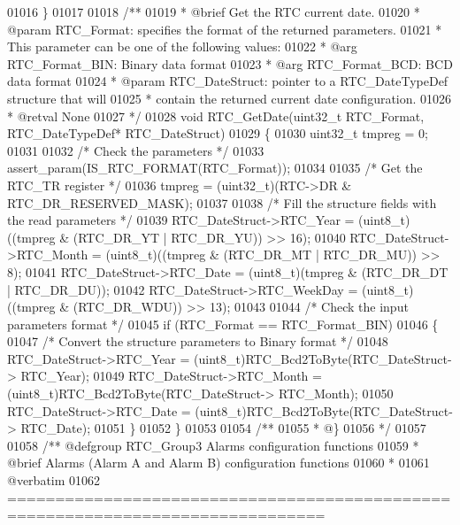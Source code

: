 \begin{DoxyCode}
01016 \}
01017 
01018 \textcolor{comment}{/**}
01019 \textcolor{comment}{  * @brief  Get the RTC current date. }
01020 \textcolor{comment}{  * @param  RTC\_Format: specifies the format of the returned parameters.}
01021 \textcolor{comment}{  *          This parameter can be one of the following values:}
01022 \textcolor{comment}{  *            @arg RTC\_Format\_BIN: Binary data format }
01023 \textcolor{comment}{  *            @arg RTC\_Format\_BCD: BCD data format}
01024 \textcolor{comment}{  * @param RTC\_DateStruct: pointer to a RTC\_DateTypeDef structure that will }
01025 \textcolor{comment}{  *                        contain the returned current date configuration.     }
01026 \textcolor{comment}{  * @retval None}
01027 \textcolor{comment}{  */}
01028 \textcolor{keywordtype}{void} RTC_GetDate(uint32\_t RTC\_Format, RTC\_DateTypeDef* RTC\_DateStruct)
01029 \{
01030   uint32\_t tmpreg = 0;
01031 
01032   \textcolor{comment}{/* Check the parameters */}
01033   assert_param(IS\_RTC\_FORMAT(RTC\_Format));
01034 
01035   \textcolor{comment}{/* Get the RTC\_TR register */}
01036   tmpreg = (uint32\_t)(RTC->DR & RTC_DR_RESERVED_MASK);
01037 
01038   \textcolor{comment}{/* Fill the structure fields with the read parameters */}
01039   RTC\_DateStruct->RTC_Year = (uint8\_t)((tmpreg & (RTC_DR_YT | RTC_DR_YU)) >> 16);
01040   RTC\_DateStruct->RTC_Month = (uint8\_t)((tmpreg & (RTC_DR_MT | RTC_DR_MU)) >> 8);
01041   RTC\_DateStruct->RTC_Date = (uint8\_t)(tmpreg & (RTC_DR_DT | RTC_DR_DU));
01042   RTC\_DateStruct->RTC_WeekDay = (uint8\_t)((tmpreg & (RTC_DR_WDU)) >> 13);
01043 
01044   \textcolor{comment}{/* Check the input parameters format */}
01045   \textcolor{keywordflow}{if} (RTC\_Format == RTC_Format_BIN)
01046   \{
01047     \textcolor{comment}{/* Convert the structure parameters to Binary format */}
01048     RTC\_DateStruct->RTC_Year = (uint8\_t)RTC_Bcd2ToByte(RTC\_DateStruct->
      RTC_Year);
01049     RTC\_DateStruct->RTC_Month = (uint8\_t)RTC_Bcd2ToByte(RTC\_DateStruct->
      RTC_Month);
01050     RTC\_DateStruct->RTC_Date = (uint8\_t)RTC_Bcd2ToByte(RTC\_DateStruct->
      RTC_Date);
01051   \}
01052 \}
01053 
01054 \textcolor{comment}{/**}
01055 \textcolor{comment}{  * @\}}
01056 \textcolor{comment}{  */}
01057 
01058 \textcolor{comment}{/** @defgroup RTC\_Group3 Alarms configuration functions}
01059 \textcolor{comment}{ *  @brief   Alarms (Alarm A and Alarm B) configuration functions }
01060 \textcolor{comment}{ *}
01061 \textcolor{comment}{@verbatim   }
01062 \textcolor{comment}{ ===============================================================================}

\end{DoxyCode}
